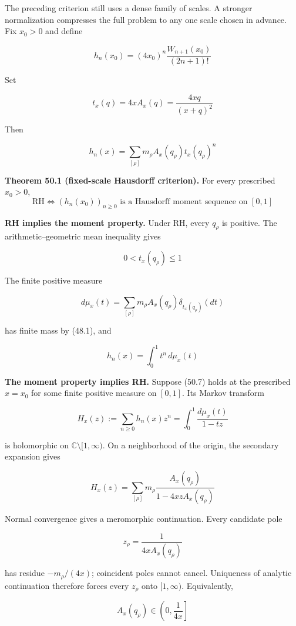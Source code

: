 \documentclass[
  11pt,
]{book}
\renewenvironment{quote}
  {\begin{tcolorbox}[
      enhanced,
      breakable,
      colback=tncream,
      colframe=tnrust,
      boxrule=0.8pt,
      arc=1.5pt,
      left=7pt,
      right=7pt,
      top=6pt,
      bottom=6pt]}
  {\end{tcolorbox}}
\begin{document}
The preceding criterion still uses a dense family of scales. A stronger
normalization compresses the full problem to any one scale chosen in
advance. Fix \(x_0>0\) and define

\[
\boxed{
h_n(x_0)
=(4x_0)^n\frac{W_{n+1}(x_0)}{(2n+1)!}}
\tag{50.1}
\]

Set

\[
t_x(q)=4xA_x(q)=\frac{4xq}{(x+q)^2}
\tag{50.2}
\]

Then

\[
h_n(x)
=\sum_{[\rho]}m_\rho A_x(q_\rho)t_x(q_\rho)^n
\tag{50.3}
\]

\begin{quote}
\textbf{Theorem 50.1 (fixed-scale Hausdorff criterion).} For every
prescribed \(x_0>0\), \[
\boxed{
\mathrm{RH}
\iff
(h_n(x_0))_{n\ge0}
\text{ is a Hausdorff moment sequence on }[0,1]}
\tag{50.4}
\]
\end{quote}

\textbf{RH implies the moment property.} Under RH, every \(q_\rho\) is
positive. The arithmetic--geometric mean inequality gives

\[
0<t_x(q_\rho)\le1
\tag{50.5}
\]

The finite positive measure

\[
d\mu_x(t)
=\sum_{[\rho]}m_\rho A_x(q_\rho)
\delta_{t_x(q_\rho)}(dt)
\tag{50.6}
\]

has finite mass by (48.1), and

\[
h_n(x)=\int_0^1t^n\,d\mu_x(t)
\tag{50.7}
\]

\textbf{The moment property implies RH.} Suppose (50.7) holds at the
prescribed \(x=x_0\) for some finite positive measure on \([0,1]\). Its
Markov transform

\[
H_x(z):=\sum_{n\ge0}h_n(x)z^n
=\int_0^1\frac{d\mu_x(t)}{1-tz}
\tag{50.8}
\]

is holomorphic on \(\mathbb C\setminus[1,\infty)\). On a neighborhood of
the origin, the secondary expansion gives

\[
H_x(z)
=\sum_{[\rho]}m_\rho
\frac{A_x(q_\rho)}{1-4xzA_x(q_\rho)}
\tag{50.9}
\]

Normal convergence gives a meromorphic continuation. Every candidate
pole

\[
z_\rho=\frac{1}{4xA_x(q_\rho)}
\tag{50.10}
\]

has residue \(-m_\rho/(4x)\); coincident poles cannot cancel. Uniqueness
of analytic continuation therefore forces every \(z_\rho\) onto
\([1,\infty)\). Equivalently,

\[
A_x(q_\rho)\in\left(0,\frac1{4x}\right]
\tag{50.11}
\]
\end{document}
